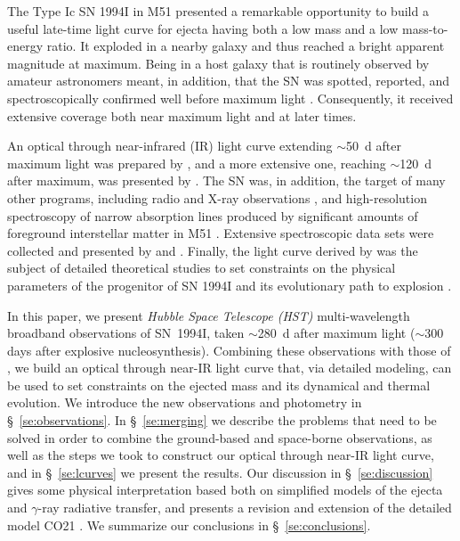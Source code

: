 \documentclass[12pt,manuscript]{aastex}
\begin{document}
The Type Ic SN 1994I in M51 presented a remarkable opportunity 
to build a useful late-time light curve for ejecta having both a 
low mass and a low mass-to-energy ratio.
%
It exploded in a nearby galaxy and thus reached a bright apparent 
magnitude at maximum.
%
Being in a host galaxy that is routinely observed by amateur 
astronomers meant, in addition, that the SN was spotted, 
reported, and spectroscopically confirmed well before maximum 
light \citep{petal94,setal94,cetal94}.
%
Consequently, it received extensive coverage both near maximum 
light and at later times.


An optical through near-infrared (IR) light curve extending $\sim$50~d 
after maximum light was prepared by \citet{schmidt94}, and a more 
extensive one, reaching $\sim$120~d after maximum, was presented 
by \citet{retal96}.
%
The SN was, in addition, the target of many other programs,
including radio and X-ray observations \citep{retal94a,ietal02}, 
and high-resolution spectroscopy of narrow absorption lines 
produced by significant amounts of foreground interstellar 
matter in M51 \citep{hetal95}.
%
Extensive spectroscopic data sets were collected and presented 
by \citet{fetal95} and \cite{cetal96b}. 
%
Finally, the light curve derived by \citet{schmidt94} was the subject 
of detailed theoretical studies to set constraints on the physical 
parameters of the progenitor of SN 1994I and its evolutionary path 
to explosion \citep{netal94,ietal94,wlyw95}.


In this paper, we present {\em Hubble Space Telescope (HST)} 
multi-wavelength broadband 
observations of SN~1994I, taken $\sim$280~d after maximum light
($\sim$300 days after explosive nucleosynthesis).
% 
Combining these observations with those of \citet{retal96},
we build an optical through near-IR light curve that, via
detailed modeling, can be used to set constraints on the 
ejected mass and its dynamical and thermal evolution.
%
We introduce the new observations and photometry in 
\S~\ref{se:observations}. 
%
In \S~\ref{se:merging} 
we describe the problems that need to be solved in order
to combine the ground-based and space-borne observations, 
as well as the steps we took to construct our optical through
near-IR light curve, and in \S~\ref{se:lcurves} we present the 
results.
%
Our discussion in \S~\ref{se:discussion} gives some physical 
interpretation based both on simplified models of the ejecta 
and $\gamma$-ray radiative transfer, and presents a revision 
and extension of the detailed model CO21 \citep{ietal94}.
%
We summarize our conclusions in \S~\ref{se:conclusions}.
\end{document}
